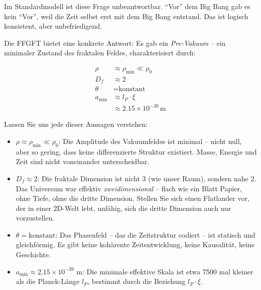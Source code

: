	Im Standardmodell ist diese Frage unbeantwortbar. \enquote{Vor} dem Big Bang gab es kein \enquote{Vor}, weil die Zeit selbst erst mit dem Big Bang entstand. Das ist logisch konsistent, aber unbefriedigend.
	
	Die FFGFT bietet eine konkrete Antwort: Es gab ein \textit{Pre-Vakuum} -- ein minimaler Zustand des fraktalen Feldes, charakterisiert durch:
	
	\[
	\begin{aligned}
		\rho &\approx \rho_{\min} \ll \rho_0 \\
		D_f &\approx 2 \\
		\theta &= \text{konstant} \\
		a_{\min} &\approx l_P \cdot \xi \\
		&\approx 2.15 \times 10^{-39} \, \text{m}
	\end{aligned}
	\]
	
	Lassen Sie uns jede dieser Aussagen verstehen:
	
	\begin{itemize}[leftmargin=*]
		\item $\rho \approx \rho_{\min} \ll \rho_0$: Die Amplitude des Vakuumfeldes ist minimal -- nicht null, aber so gering, dass keine differenzierte Struktur existiert. Masse, Energie und Zeit sind nicht voneinander unterscheidbar.
		
		\item $D_f \approx 2$: Die fraktale Dimension ist nicht 3 (wie unser Raum), sondern nahe 2. Das Universum war effektiv \textit{zweidimensional} -- flach wie ein Blatt Papier, ohne Tiefe, ohne die dritte Dimension. Stellen Sie sich einen Flatlander vor, der in einer 2D-Welt lebt, unfähig, sich die dritte Dimension auch nur vorzustellen.
		
		\item $\theta = \text{konstant}$: Das Phasenfeld -- das die Zeitstruktur codiert -- ist statisch und gleichförmig. Es gibt keine kohärente Zeitentwicklung, keine Kausalität, keine Geschichte.
		
		\item $a_{\min} \approx 2.15 \times 10^{-39}$ m: Die minimale effektive Skala ist etwa 7500 mal kleiner als die Planck-Länge $l_P$, bestimmt durch die Beziehung $l_P \cdot \xi$.
	\end{itemize}
	
